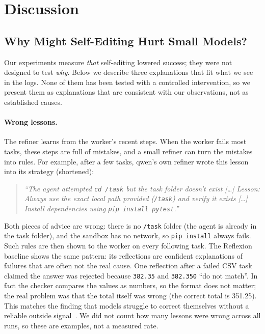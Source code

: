 \section{Discussion}
\label{sec:discussion}

\subsection{Why Might Self-Editing Hurt Small Models?}

Our experiments measure \emph{that} self-editing lowered success; they were not designed to test
\emph{why}. Below we describe three explanations that fit what we see in the logs. None of them has
been tested with a controlled intervention, so we present them as explanations that are consistent
with our observations, not as established causes.

\paragraph{Wrong lessons.}
The refiner learns from the worker's recent steps. When the worker fails most tasks, these steps
are full of mistakes, and a small refiner can turn the mistakes into rules. For example, after a
few tasks, qwen's own refiner wrote this lesson into its strategy (shortened):
\begin{quote}\small
\emph{``The agent attempted \texttt{cd /task} but the task folder doesn't exist [\ldots]
Lesson: Always use the exact local path provided (\texttt{/task}) and verify it exists [\ldots]
Install dependencies using \texttt{pip install pytest}.''}
\end{quote}
Both pieces of advice are wrong: there is no \texttt{/task} folder (the agent is already in the task
folder), and the sandbox has no network, so \texttt{pip install} always fails. Such rules are then
shown to the worker on every following task. The Reflexion baseline shows the same pattern: its
reflections are confident explanations of failures that are often not the real cause. One
reflection after a failed CSV task claimed the answer was rejected because \texttt{382.35} and
\texttt{382.350} ``do not match''. In fact the checker compares the values as numbers, so the
format does not matter; the real problem was that the total itself was wrong (the correct total is
351.25). This matches the finding that models struggle to correct themselves without a reliable
outside signal~\cite{huang2024cannot}. We did not count how many lessons were wrong across all
runs, so these are examples, not a measured rate.

